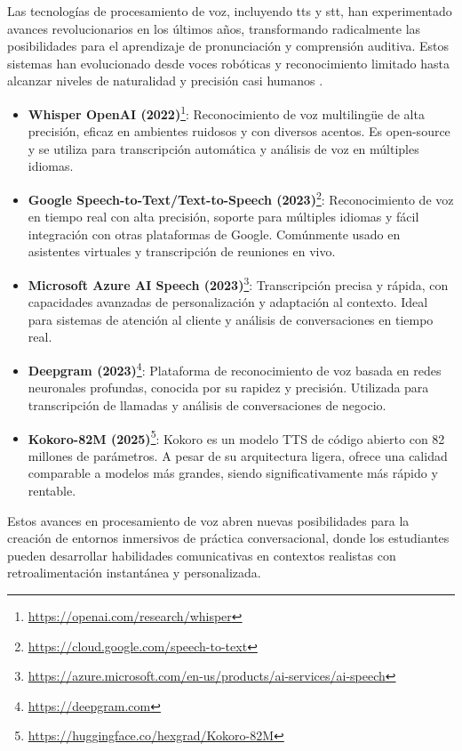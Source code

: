 Las tecnologías de procesamiento de voz, incluyendo \gls{tts} y \gls{stt}, han experimentado avances revolucionarios en los últimos años, transformando radicalmente las posibilidades para el aprendizaje de pronunciación y comprensión auditiva. Estos sistemas han evolucionado desde voces robóticas y reconocimiento limitado hasta alcanzar niveles de naturalidad y precisión casi humanos \citep{graves2013speech}.


\begin{itemize}
  \item \textbf{Whisper OpenAI (2022)}\footnote{\url{https://openai.com/research/whisper}}: Reconocimiento de voz multilingüe de alta precisión, eficaz en ambientes ruidosos y con diversos acentos. Es \gls{open-source} y se utiliza para transcripción automática y análisis de voz en múltiples idiomas.
  \item \textbf{Google Speech-to-Text/Text-to-Speech (2023)}\footnote{\url{https://cloud.google.com/speech-to-text}}: Reconocimiento de voz en tiempo real con alta precisión, soporte para múltiples idiomas y fácil integración con otras plataformas de Google. Comúnmente usado en asistentes virtuales y transcripción de reuniones en vivo.
  \item \textbf{Microsoft Azure AI Speech (2023)}\footnote{\url{https://azure.microsoft.com/en-us/products/ai-services/ai-speech}}: Transcripción precisa y rápida, con capacidades avanzadas de personalización y adaptación al contexto. Ideal para sistemas de atención al cliente y análisis de conversaciones en tiempo real.
  \item \textbf{Deepgram (2023)}\footnote{\url{https://deepgram.com}}: Plataforma de reconocimiento de voz basada en redes neuronales profundas, conocida por su rapidez y precisión. Utilizada para transcripción de llamadas y análisis de conversaciones de negocio.
  \item \textbf{Kokoro-82M (2025)}\footnote{\url{https://huggingface.co/hexgrad/Kokoro-82M}}: Kokoro es un modelo TTS de código abierto con 82 millones de parámetros. A pesar de su arquitectura ligera, ofrece una calidad comparable a modelos más grandes, siendo significativamente más rápido y rentable.
\end{itemize}

Estos avances en procesamiento de voz abren nuevas posibilidades para la creación de entornos inmersivos de práctica conversacional, donde los estudiantes pueden desarrollar habilidades comunicativas en contextos realistas con retroalimentación instantánea y personalizada.


